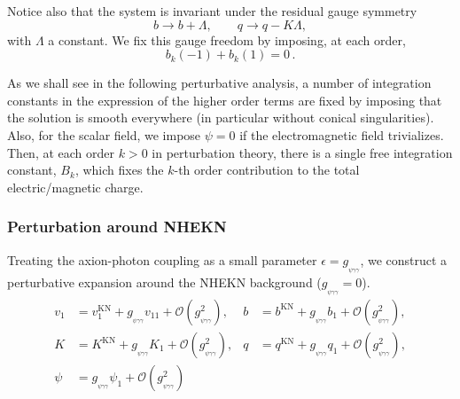 \documentclass[11pt]{article}
\numberwithin{equation}{section} %
\begin{document}
Notice also that the system is invariant under the residual gauge symmetry
\begin{equation}\label{eq:gauge}
    b\rightarrow b+\Lambda,\qquad q\rightarrow q-K\Lambda ,
\end{equation}
%
with \(\Lambda\) a constant. We fix this gauge freedom by imposing, at each order,
\begin{equation}
    b_k(-1)+b_k(1)=0\,.
\end{equation}


 
 As we shall see in the following perturbative analysis, a number of integration constants in the expression of
 the higher order terms
are fixed by imposing that the solution is smooth everywhere (in particular without conical singularities).
Also, for the scalar field, we impose
$\psi=0$
if the electromagnetic field trivializes.
Then, 
at  each order $k>0$ in perturbation theory,
there is a single free integration constant, $B_k$,
which fixes the $k$-th order contribution to the total
electric/magnetic charge.


 \subsubsection{Perturbation around NHEKN}\label{NHEKN}

 Treating the axion-photon coupling as a small parameter $\epsilon=g_{_{\psi\gamma\gamma}}$, we construct a perturbative expansion around the NHEKN background ($g_{_{\psi\gamma\gamma}}=0$). 
%
\begin{align}
 v_1 &= v_1^{\scriptscriptstyle\mathrm{KN}}+g_{_{\psi\gamma\gamma}} v_{11}+\mathcal{O}(g_{_{\psi\gamma\gamma}}^2),&
 b &= b^{\scriptscriptstyle\mathrm{KN}}+g_{_{\psi\gamma\gamma}} b_{1}+\mathcal{O}(g_{_{\psi\gamma\gamma}}^2),\nonumber\\
 K &= K^{\scriptscriptstyle\mathrm{KN}}+g_{_{\psi\gamma\gamma}} K_{1}+\mathcal{O}(g_{_{\psi\gamma\gamma}}^2),&
 q &= q^{\scriptscriptstyle\mathrm{KN}}+g_{_{\psi\gamma\gamma}} q_{1}+\mathcal{O}(g_{_{\psi\gamma\gamma}}^2),\nonumber\\
 \psi &= g_{_{\psi\gamma\gamma}}\psi_{1}+\mathcal{O}(g_{_{\psi\gamma\gamma}}^2)
\end{align}
\end{document}
